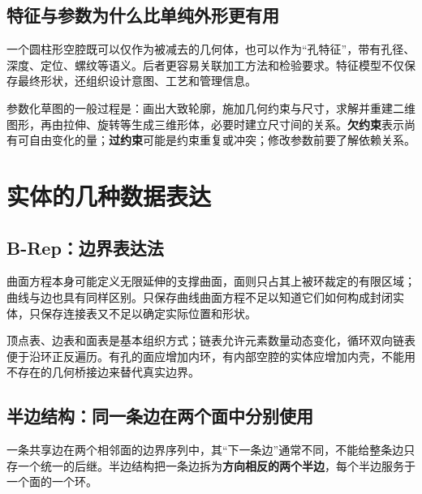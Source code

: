 \subsection{特征与参数为什么比单纯外形更有用}
一个圆柱形空腔既可以仅作为被减去的几何体，也可以作为“孔特征”，带有孔径、深度、定位、螺纹等语义。后者更容易关联加工方法和检验要求。特征模型不仅保存最终形状，还组织设计意图、工艺和管理信息。

参数化草图的一般过程是：画出大致轮廓，施加几何约束与尺寸，求解并重建二维图形，再由拉伸、旋转等生成三维形体，必要时建立尺寸间的关系。\textbf{欠约束}表示尚有可自由变化的量；\textbf{过约束}可能是约束重复或冲突；修改参数前要了解依赖关系。


\section{实体的几种数据表达}
\subsection{B-Rep：边界表达法}


曲面方程本身可能定义无限延伸的支撑曲面，面则只占其上被环裁定的有限区域；曲线与边也具有同样区别。只保存曲线曲面方程不足以知道它们如何构成封闭实体，只保存连接表又不足以确定实际位置和形状。

顶点表、边表和面表是基本组织方式；链表允许元素数量动态变化，循环双向链表便于沿环正反遍历。有孔的面应增加内环，有内部空腔的实体应增加内壳，不能用不存在的几何桥接边来替代真实边界。

\subsection{半边结构：同一条边在两个面中分别使用}
一条共享边在两个相邻面的边界序列中，其“下一条边”通常不同，不能给整条边只存一个统一的后继。半边结构把一条边拆为\textbf{方向相反的两个半边}，每个半边服务于一个面的一个环。

